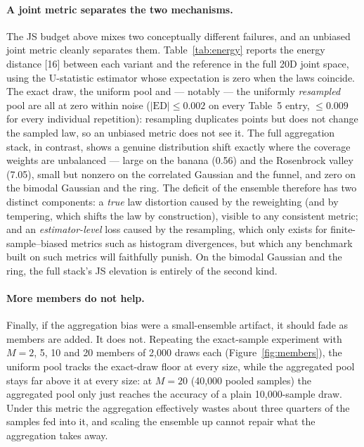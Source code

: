 \documentclass[11pt]{article}
\begin{document}
\paragraph{A joint metric separates the two mechanisms.}
The JS budget above mixes two conceptually different failures, and an unbiased
joint metric cleanly separates them. Table~\ref{tab:energy} reports the
energy distance [16] between each variant and the reference in the full 20D
joint space, using the U-statistic estimator whose expectation is zero when
the laws coincide. The exact draw, the uniform pool and --- notably --- the
uniformly \emph{resampled} pool are all at zero within noise
($|\mathrm{ED}|\le 0.002$ on every Table~5 entry, $\le 0.009$ for every
individual repetition): resampling duplicates points but does
not change the sampled law, so an unbiased metric does not see it. The full
aggregation stack, in contrast, shows a genuine distribution shift exactly
where the coverage weights are unbalanced --- large on the banana (0.56) and
the Rosenbrock valley (7.05), small but nonzero on the correlated Gaussian and
the funnel, and zero on the bimodal Gaussian and the ring. The deficit of the
ensemble therefore has two distinct components: a \emph{true} law distortion
caused by the reweighting (and by tempering, which shifts the law by
construction), visible to any consistent metric; and an \emph{estimator-level}
loss caused by the resampling, which only exists for finite-sample--biased
metrics such as histogram divergences, but which any benchmark built on such
metrics will faithfully punish. On the bimodal Gaussian and the ring, the full
stack's JS elevation is entirely of the second kind.

\begin{table}[htbp]
\centering
\caption{Energy distance (unbiased U-statistic, 2{,}000-point subsamples, mean
of five repetitions) between each exact-sample variant and the reference, 20D
configurations. Zero means the laws coincide. Resampling leaves the law
untouched; the full aggregation stack shifts it, most strongly where the
coverage clusters are unbalanced. (Values are in the native scale of each
target, so they are comparable within columns, not across them.)}
\label{tab:energy}
\small

\end{table}

\paragraph{More members do not help.}
Finally, if the aggregation bias were a small-ensemble artifact, it should
fade as members are added. It does not. Repeating the exact-sample experiment
with $M=2$, 5, 10 and 20 members of 2{,}000 draws each
(Figure~\ref{fig:members}), the uniform pool tracks the exact-draw floor at
every size, while the aggregated pool stays far above it at every size: at
$M=20$ (40{,}000 pooled samples) the aggregated pool only just reaches the
accuracy of a plain 10{,}000-sample draw. Under this metric the aggregation
effectively wastes about three quarters of the samples fed into it, and
scaling the ensemble up cannot repair what the aggregation takes away.
\end{document}
